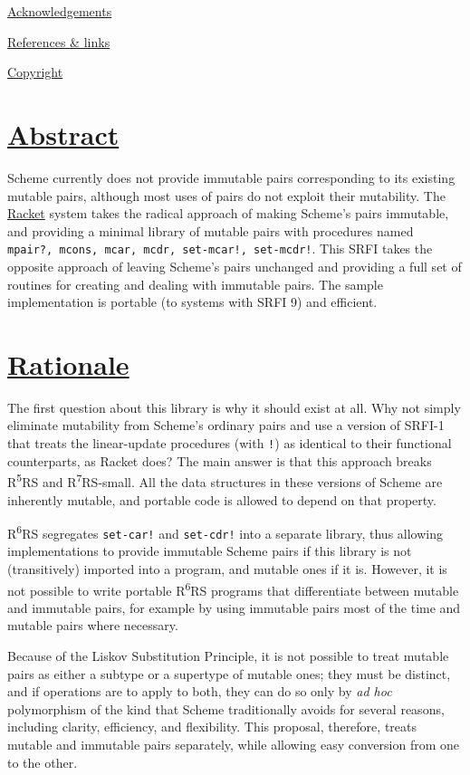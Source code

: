 \protect\hyperlink{Acknowledgements}{Acknowledgements}

\protect\hyperlink{ReferencesLinks}{References \& links}

\protect\hyperlink{Copyright}{Copyright}

\section{\texorpdfstring{\href{}{Abstract}}{Abstract}}\label{abstract}

Scheme currently does not provide immutable pairs corresponding to its
existing mutable pairs, although most uses of pairs do not exploit their
mutability. The \href{http://www.racket-lang.org}{Racket} system takes
the radical approach of making Scheme's pairs immutable, and providing a
minimal library of mutable pairs with procedures named
\texttt{mpair?,\ mcons,\ mcar,\ mcdr,\ set-mcar!,\ set-mcdr!}. This SRFI
takes the opposite approach of leaving Scheme's pairs unchanged and
providing a full set of routines for creating and dealing with immutable
pairs. The sample implementation is portable (to systems with SRFI 9)
and efficient.

\section{\texorpdfstring{\href{}{Rationale}}{Rationale}}\label{rationale}

The first question about this library is why it should exist at all. Why
not simply eliminate mutability from Scheme's ordinary pairs and use a
version of SRFI-1 that treats the linear-update procedures (with
\texttt{!}) as identical to their functional counterparts, as Racket
does? The main answer is that this approach breaks
R\textsuperscript{5}RS and R\textsuperscript{7}RS-small. All the data
structures in these versions of Scheme are inherently mutable, and
portable code is allowed to depend on that property.

R\textsuperscript{6}RS segregates \texttt{set-car!} and
\texttt{set-cdr!} into a separate library, thus allowing implementations
to provide immutable Scheme pairs if this library is not (transitively)
imported into a program, and mutable ones if it is. However, it is not
possible to write portable R\textsuperscript{6}RS programs that
differentiate between mutable and immutable pairs, for example by using
immutable pairs most of the time and mutable pairs where necessary.

Because of the Liskov Substitution Principle, it is not possible to
treat mutable pairs as either a subtype or a supertype of mutable ones;
they must be distinct, and if operations are to apply to both, they can
do so only by \emph{ad hoc} polymorphism of the kind that Scheme
traditionally avoids for several reasons, including clarity, efficiency,
and flexibility. This proposal, therefore, treats mutable and immutable
pairs separately, while allowing easy conversion from one to the other.

